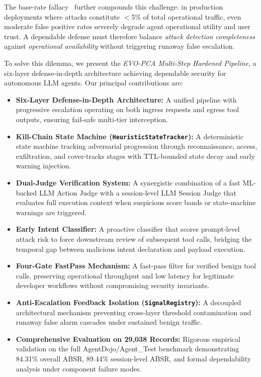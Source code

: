 \documentclass[conference]{IEEEtran}
\begin{document}
The base-rate fallacy~\cite{axelsson2000base} further compounds this challenge: in production deployments where attacks constitute $<$5\% of total operational traffic, even moderate false positive rates severely degrade agent operational utility and user trust. A dependable defense must therefore balance \textit{attack detection completeness} against \textit{operational availability} without triggering runaway false escalation.

To solve this dilemma, we present the \textit{EVO-PCA Multi-Step Hardened Pipeline}, a six-layer defense-in-depth architecture achieving dependable security for autonomous LLM agents. Our principal contributions are:

\begin{itemize}[leftmargin=*]
    \item \textbf{Six-Layer Defense-in-Depth Architecture:} A unified pipeline with progressive escalation operating on both ingress requests and egress tool outputs, ensuring fail-safe multi-tier interception.
    \item \textbf{Kill-Chain State Machine (\texttt{HeuristicStateTracker}):} A deterministic state machine tracking adversarial progression through reconnaissance, access, exfiltration, and cover-tracks stages with TTL-bounded state decay and early warning injection.
    \item \textbf{Dual-Judge Verification System:} A synergistic combination of a fast ML-backed LLM Action Judge with a session-level LLM Session Judge that evaluates full execution context when suspicious score bands or state-machine warnings are triggered.
    \item \textbf{Early Intent Classifier:} A proactive classifier that scores prompt-level attack risk to force downstream review of subsequent tool calls, bridging the temporal gap between malicious intent declaration and payload execution.
    \item \textbf{Four-Gate FastPass Mechanism:} A fast-pass filter for verified benign tool calls, preserving operational throughput and low latency for legitimate developer workflows without compromising security invariants.
    \item \textbf{Anti-Escalation Feedback Isolation (\texttt{SignalRegistry}):} A decoupled architectural mechanism preventing cross-layer threshold contamination and runaway false alarm cascades under sustained benign traffic.
    \item \textbf{Comprehensive Evaluation on 29,038 Records:} Rigorous empirical validation on the full AgentDojo/Agent\_Test benchmark demonstrating 84.31\% overall ABSR, 89.44\% session-level ABSR, and formal dependability analysis under component failure modes.
\end{itemize}
\end{document}
